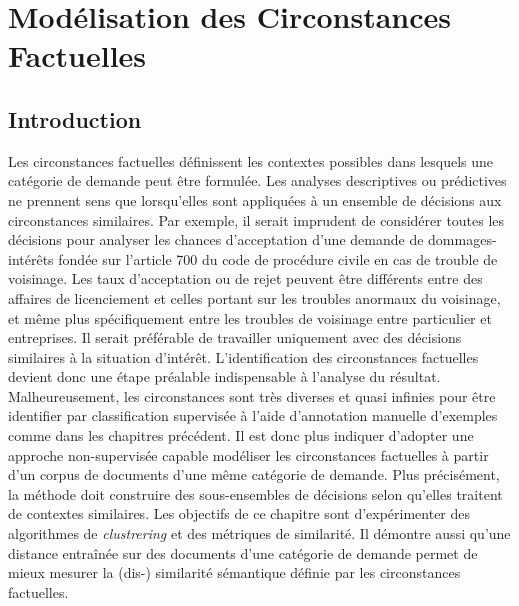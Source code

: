  \chapter{Modélisation des Circonstances Factuelles}
\label{chap:similarite}

% 

\section{Introduction}
\label{sec:similarite:introduction}
Les circonstances factuelles définissent les contextes possibles dans lesquels une catégorie de demande peut être formulée. Les analyses descriptives ou prédictives ne prennent sens que lorsqu'elles sont appliquées à un ensemble de décisions aux circonstances similaires. Par exemple, il serait imprudent de considérer toutes les décisions pour analyser les chances d'acceptation d'une demande de dommages-intérêts fondée sur l'\og article 700 du code de procédure civile \fg{} en cas de trouble de voisinage. Les taux d'acceptation ou de rejet peuvent être différents entre des affaires de licenciement et celles portant sur les troubles anormaux du voisinage, et même plus spécifiquement entre les troubles de voisinage entre particulier et entreprises. %
 Il serait préférable de travailler uniquement avec des décisions similaires à la situation d'intérêt. L'identification des circonstances factuelles devient donc une étape préalable indispensable à l'analyse du résultat. Malheureusement, les circonstances sont très diverses et quasi infinies pour être identifier par classification supervisée à l'aide d'annotation manuelle d'exemples comme dans les chapitres précédent. Il est donc plus indiquer d'adopter une approche non-supervisée capable modéliser les circonstances factuelles à partir d'un corpus de documents d'une même catégorie de demande. Plus précisément, la méthode doit construire des sous-ensembles de décisions selon qu'elles traitent de contextes similaires.  Les objectifs de ce chapitre sont d'expérimenter des algorithmes  de \textit{clustrering} et des métriques de similarité. Il démontre aussi qu'une distance entraînée  sur des documents d'une catégorie de demande permet de mieux mesurer la (dis-) similarité sémantique définie par les circonstances factuelles.

